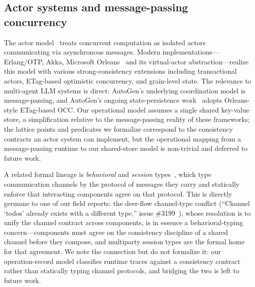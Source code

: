 \documentclass[journal,compsoc,10pt]{IEEEtran}
\providecommand{\citep}{\cite}
\theoremstyle{definition}
\theoremstyle{remark}
\begin{document}
\subsection{Actor systems and message-passing concurrency}
\label{sec:related-actors}
The actor model~\citep{Hewitt1973} treats concurrent computation as
isolated actors communicating via asynchronous messages. Modern
implementations---Erlang/OTP, Akka, Microsoft
Orleans~\citep{BernsteinEtAl2014Orleans} and its virtual-actor
abstraction---realize this model with various strong-consistency
extensions including transactional actors, ETag-based optimistic
concurrency, and grain-level state. The relevance to multi-agent
LLM systems is direct: AutoGen's underlying coordination model is
message-passing, and AutoGen's ongoing state-persistence
work~\citep{AutoGenPR3954} adopts Orleans-style ETag-based OCC.
Our operational model assumes a single shared key-value store, a
simplification relative to the message-passing reality of these
frameworks; the lattice points and predicates we formalize
correspond to the consistency contracts an actor system can
implement, but the operational mapping from a message-passing
runtime to our shared-store model is non-trivial and deferred to
future work.

\medskip
A related formal lineage is \emph{behavioral} and \emph{session}
types~\citep{HondaYoshidaCarbone2008MPST}, which type communication
channels by the protocol of messages they carry and statically enforce that
interacting components agree on that protocol. This is directly germane to
one of our field reports: the deer-flow channel-type conflict
(``Channel `todos' already exists with a different type,'' issue
\#3199~\citep{DeerFlowIssue3199}), whose resolution is to unify the channel
contract across components, is in essence a behavioral-typing
concern---components must agree on the consistency discipline of a shared
channel before they compose, and multiparty session types are the formal
home for that agreement. We note the connection but do not formalize it:
our operation-record model classifies runtime traces against a consistency
contract rather than statically typing channel protocols, and bridging the
two is left to future work.
\end{document}
